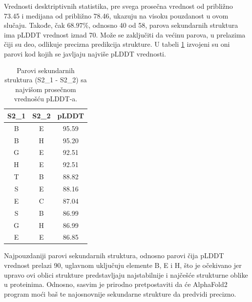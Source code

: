 \documentclass[a4paper,12pt]{article}
\begin{document}
Vrednosti desktriptivnih statistika, pre svega prosečna vrednost od približno 73.45 i medijana od približno 78.46, ukazuju na visoku pouzdanost u ovom slučaju. Takođe, čak $68.97\%$, odnosno 40 od 58, parova sekundarnih struktura ima pLDDT vrednost iznad 70. Može se zaključiti da većinu parova, u prelazima čiji su deo, odlikuje precizna predikcija strukture. U tabeli \ref{Tabela:9} izvojeni su oni parovi kod kojih se javljaju najviše pLDDT vrednosti.
\begin{table}[h!]
\centering
\begin{tabular}{|c|c|c|}
\hline
\textbf{S2\_1} & \textbf{S2\_2} & \textbf{pLDDT} \\
\hline
B & E & 95.59 \\
\hline
B & H & 95.20 \\
\hline
G & E & 92.51 \\
\hline
H & E & 92.51 \\
\hline
T & B & 88.82 \\
\hline
S & E & 88.16 \\
\hline
E & C & 87.04 \\
\hline
S & B & 86.99 \\
\hline
G & H & 86.99 \\
\hline
E & E & 86.85 \\
\hline
\end{tabular}
\caption{Parovi sekundarnih struktura (S2\_1 - S2\_2) sa najvišom prosečnom vrednošću pLDDT-a.}
\label{Tabela:9}
\end{table}
\newpage
Najpouzdaniji parovi sekundarnih struktura, odnosno parovi čija pLDDT vrednost prelazi 90, uglavnom uključuju elemente B, E i H, što je očekivano jer upravo ovi oblici strukture predstavljaju najstabilnije i najčešće strukturne oblike u proteinima. Odnosno, sasvim je prirodno pretpostaviti da će AlphaFold2 program moći baš te najosnovnije sekundarne strukture da predvidi precizno.
\end{document}
